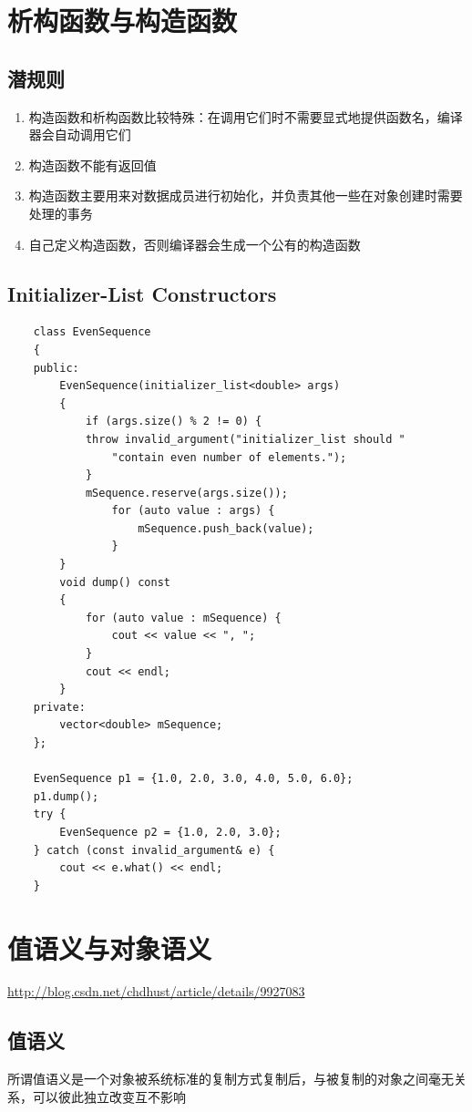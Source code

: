 \documentclass[UTF8,a4paper,12pt]{ctexbook} %
\begin{document}
\section{析构函数与构造函数}
		\subsection{潜规则}
		    \begin{enumerate}[fullwidth,itemindent=2em,label=(\arabic*)]
		       \item  构造函数和析构函数比较特殊：在调用它们时不需要显式地提供函数名，编译器会自动调用它们
		       
		       \item  构造函数不能有返回值
		       
		       \item  构造函数主要用来对数据成员进行初始化，并负责其他一些在对象创建时需要处理的事务
		       
		       \item  自己定义构造函数，否则编译器会生成一个公有的构造函数
		    \end{enumerate}
		  \subsection{Initializer-List Constructors}    
			  \begin{lstlisting}
	class EvenSequence
	{
	public:
		EvenSequence(initializer_list<double> args)
		{
			if (args.size() % 2 != 0) {
			throw invalid_argument("initializer_list should "
				"contain even number of elements.");
			}
			mSequence.reserve(args.size());
				for (auto value : args) {
					mSequence.push_back(value);
				}
		}
		void dump() const
		{
			for (auto value : mSequence) {
				cout << value << ", ";
			}
			cout << endl;
		}	
	private:
		vector<double> mSequence;
	};
	
	EvenSequence p1 = {1.0, 2.0, 3.0, 4.0, 5.0, 6.0};
	p1.dump();
	try {
		EvenSequence p2 = {1.0, 2.0, 3.0};
	} catch (const invalid_argument& e) {
		cout << e.what() << endl;
	}
			  \end{lstlisting} 
	
\section{值语义与对象语义}
	\url{http://blog.csdn.net/chdhust/article/details/9927083}
	
	\subsection{值语义}
		所谓值语义是一个对象被系统标准的复制方式复制后，与被复制的对象之间毫无关系，可以彼此独立改变互不影响
	
\end{document}
